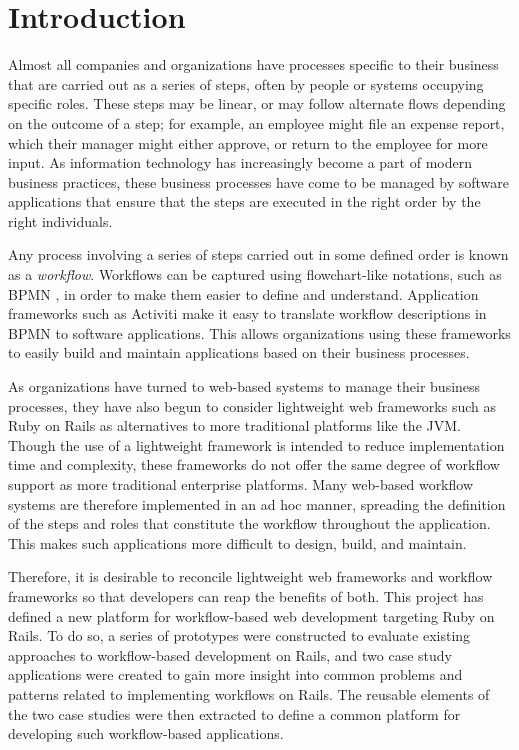 \documentclass[document.tex]{subfiles}
\begin{document}
\chapter{Introduction}

Almost all companies and organizations have processes specific to their business that are carried out as a series of steps, often by people or systems occupying specific roles.
These steps may be linear, or may follow alternate flows depending on the outcome of a step; for example, an employee might file an expense report, which their manager might either approve, or return to the employee for more input.
As information technology has increasingly become a part of modern business practices, these business processes have come to be managed by software applications that ensure that the steps are executed in the right order by the right individuals.

Any process involving a series of steps carried out in some defined order is known as a \emph{workflow}.
Workflows can be captured using flowchart-like notations, such as BPMN \cite{bpmn}, in order to make them easier to define and understand.
Application frameworks such as Activiti \cite{activiti} make it easy to translate workflow descriptions in BPMN to software applications.
This allows organizations using these frameworks to easily build and maintain applications based on their business processes.

As organizations have turned to web-based systems to manage their business processes, they have also begun to consider lightweight web frameworks such as Ruby on Rails as alternatives to more traditional platforms like the JVM.
Though the use of a lightweight framework is intended to reduce implementation time and complexity, these frameworks do not offer the same degree of workflow support as more traditional enterprise platforms.
Many web-based workflow systems are therefore implemented in an ad hoc manner, spreading the definition of the steps and roles that constitute the workflow throughout the application.
This makes such applications more difficult to design, build, and maintain.

Therefore, it is desirable to reconcile lightweight web frameworks and workflow frameworks so that developers can reap the benefits of both. This project has defined a new platform for workflow-based web development targeting Ruby on Rails. To do so, a series of prototypes were constructed to evaluate existing approaches to workflow-based development on Rails, and two case study applications were created to gain more insight into common problems and patterns related to implementing workflows on Rails. The reusable elements of the two case studies were then extracted to define a common platform for developing such workflow-based applications.
\end{document}

